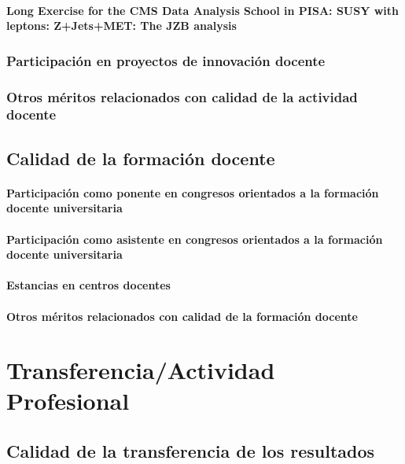 \documentclass[a4paper, 11pt, twoside, openright]{report}
\begin{document}
\subsubsection{Long Exercise for the CMS Data Analysis School in PISA: SUSY with leptons: Z+Jets+MET: The JZB analysis}



\subsection{Participación en proyectos de innovación docente}

\subsection{Otros méritos relacionados con calidad de la actividad docente}

\section{Calidad de la formación docente}

\subsubsection{Participación como ponente en congresos orientados a la formación docente universitaria}

\subsubsection{Participación como asistente en congresos orientados a la formación docente universitaria}

\subsubsection{Estancias en centros docentes}

\subsubsection{Otros méritos relacionados con calidad de la formación docente}


\chapter{Transferencia/Actividad Profesional}

\section{Calidad de la transferencia de los resultados}
\end{document}
